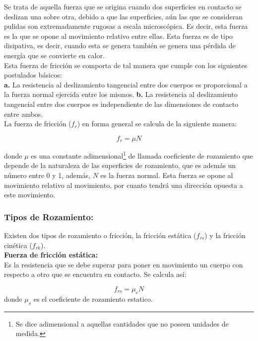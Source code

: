 \documentclass[a5paper,pagesize,10pt,bibtotoc,pointlessnumbers,
normalheadings,DIV=9,fleqn,x11names,table,twoside=false]{scrbook}
\begin{document}
Se trata de aquella fuerza que se origina cuando dos superficies en contacto se deslizan una sobre otra, debido a que las 
superficies, aún las que se consideran pulidas son extremadamente rugosas a escala microscópica. Es decir, esta fuerza es la que 
se opone al movimiento relativo entre ellas. Esta fuerza es de tipo disipativa, es decir, cuando esta se genera también se genera 
una pérdida de energía que se convierte en calor.\\

Esta fuerza de fricción se comporta de tal manera que cumple con los siguientes postulados básicos:\\

\textbf{a.} La resistencia al deslizamiento tangencial entre dos cuerpos es proporcional a la fuerza normal ejercida entre los 
mismos.
\textbf{b.} La resistencia al deslizamiento tangencial entre dos cuerpos es independiente de las dimensiones de contacto entre 
ambos.\\

La fuerza de fricción ($f_r$) en forma general se calcula de la siguiente manera:

\begin{equation}
f_r = \mu N
\end{equation}
  
donde $\mu$ es una constante adimensional\footnote{Se dice adimensional a aquellas cantidades que no poseen unidades de medida.} 
de llamada coeficiente de rozamiento que depende de la naturaleza de las superficies de rozamiento, que es además un número entre 
0 y 1, además, $N$ es la fuerza normal. Esta fuerza se opone al movimiento relativo al movimiento, por cuanto tendrá una 
dirección opuesta a este movimiento.  
    
\subsubsection{Tipos de Rozamiento:}

Existen dos tipos de rozamiento o fricción, la fricción estática ($f_{rs}$) y la fricción cinética ($f_{rk}$).\\ 
 
\textbf{Fuerza de fricción estática:}\\

Es la resistencia que se debe superar para poner en movimiento un cuerpo con respecto a otro que se encuentra en 
contacto. Se calcula así:

\begin{equation}
f_{rs} = \mu_e N
\end{equation}
donde $\mu_s$ es el coeficiente de rozamiento estatico.\\
\end{document}
